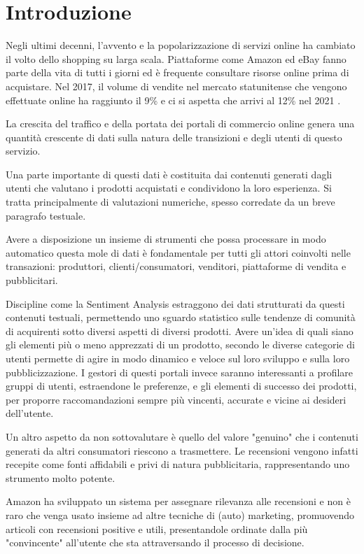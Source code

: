 \chapter{Introduzione}

Negli ultimi decenni, l'avvento e la popolarizzazione di servizi online ha cambiato il volto dello shopping su larga scala. Piattaforme come Amazon ed eBay fanno parte della vita di tutti i giorni ed è frequente consultare risorse online prima di acquistare. Nel 2017, il volume di vendite nel mercato statunitense che vengono effettuate online ha raggiunto il 9\% e ci si aspetta che arrivi al 12\% nel 2021 \cite{usb1}.

La crescita del traffico e della portata dei portali di commercio online genera una quantità crescente di dati sulla natura delle transizioni e degli utenti di questo servizio.

Una parte importante di questi dati è costituita dai contenuti generati dagli utenti che valutano i prodotti acquistati e condividono la loro esperienza. Si tratta principalmente di valutazioni numeriche, spesso corredate da un breve paragrafo testuale.

Avere a disposizione un insieme di strumenti che possa processare in modo automatico questa mole di dati è fondamentale per tutti gli attori coinvolti nelle transazioni: produttori, clienti/consumatori, venditori, piattaforme di vendita e pubblicitari.

Discipline come la Sentiment Analysis estraggono dei dati strutturati da questi contenuti testuali, permettendo uno sguardo statistico sulle tendenze di comunità di acquirenti sotto diversi aspetti di diversi prodotti. Avere un'idea di quali siano gli elementi più o meno apprezzati di un prodotto, secondo le diverse categorie di utenti permette di agire in modo dinamico e veloce sul loro sviluppo e sulla loro pubblicizzazione. I gestori di questi portali invece saranno interessanti a profilare gruppi di utenti, estraendone le preferenze, e gli elementi di successo dei prodotti, per proporre raccomandazioni sempre più vincenti, accurate e vicine ai desideri dell'utente.

Un altro aspetto da non sottovalutare è quello del valore "genuino" che i contenuti generati da altri consumatori riescono a trasmettere. Le recensioni vengono infatti recepite come fonti affidabili e privi di  natura pubblicitaria, rappresentando uno strumento molto potente.

Amazon ha sviluppato un sistema per assegnare rilevanza alle recensioni e non è raro che venga usato insieme ad altre tecniche di (auto) marketing, promuovendo articoli con recensioni positive e utili, presentandole ordinate dalla più "convincente" all'utente che sta attraversando il processo di decisione.

